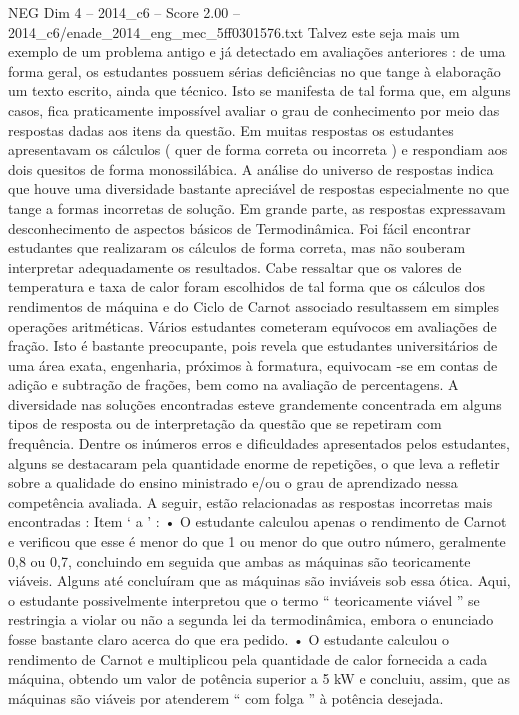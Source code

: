 \begin{textsample}{NEG Dim 4 – 2014\_c6 – Score 2.00 – 2014\_c6/enade\_2014\_eng\_mec\_5ff0301576.txt}
Talvez este seja mais um exemplo de um problema antigo e já detectado em avaliações anteriores : de uma forma geral, os estudantes possuem sérias deficiências no que tange à elaboração um texto escrito, ainda que técnico.
Isto se manifesta de tal forma que, em alguns casos, fica praticamente impossível avaliar o grau de conhecimento por meio das respostas dadas aos itens da questão.
Em muitas respostas os estudantes apresentavam os cálculos ( quer de forma correta ou incorreta ) e respondiam aos dois quesitos de forma monossilábica.
A análise do universo de respostas indica que houve uma diversidade bastante apreciável de respostas especialmente no que tange a formas incorretas de solução.
Em grande parte, as respostas expressavam desconhecimento de aspectos básicos de Termodinâmica.
Foi fácil encontrar estudantes que realizaram os cálculos de forma correta, mas não souberam interpretar adequadamente os resultados.
Cabe ressaltar que os valores de temperatura e taxa de calor foram escolhidos de tal forma que os cálculos dos rendimentos de máquina e do Ciclo de Carnot associado resultassem em simples operações aritméticas.
Vários estudantes cometeram equívocos em avaliações de fração.
Isto é bastante preocupante, pois revela que estudantes universitários de uma área exata, engenharia, próximos à formatura, equivocam -se em contas de adição e subtração de frações, bem como na avaliação de percentagens.
A diversidade nas soluções encontradas esteve grandemente concentrada em alguns tipos de resposta ou de interpretação da questão que se repetiram com frequência.
Dentre os inúmeros erros e dificuldades apresentados pelos estudantes, alguns se destacaram pela quantidade enorme de repetições, o que leva a refletir sobre a qualidade do ensino ministrado e/ou o grau de aprendizado nessa competência avaliada.
A seguir, estão relacionadas as respostas incorretas mais encontradas : Item ‘ a ’ : • O estudante calculou apenas o rendimento de Carnot e verificou que esse é menor do que 1 ou menor do que outro número, geralmente 0,8 ou 0,7, concluindo em seguida que ambas as máquinas são teoricamente viáveis.
Alguns até concluíram que as máquinas são inviáveis sob essa ótica.
Aqui, o estudante possivelmente interpretou que o termo “ teoricamente viável ” se restringia a violar ou não a segunda lei da termodinâmica, embora o enunciado fosse bastante claro acerca do que era pedido. • O estudante calculou o rendimento de Carnot e multiplicou pela quantidade de calor fornecida a cada máquina, obtendo um valor de potência superior a 5 kW e concluiu, assim, que as máquinas são viáveis por atenderem “ com folga ” à potência desejada.

\end{textsample}
